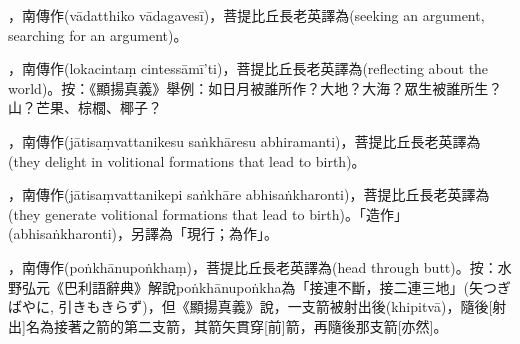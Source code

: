 \startitemgroup[noteitems]
\item{}，南傳作(vādatthiko vādagavesī)，菩提比丘長老英譯為(seeking an argument, searching for an argument)。
\stopitemgroup

\startitemgroup[noteitems]
\item{}，南傳作(lokacintaṃ cintessāmī’ti)，菩提比丘長老英譯為(reflecting about the world)。按：《顯揚真義》舉例：如日月被誰所作？大地？大海？眾生被誰所生？山？芒果、棕櫚、椰子？
\stopitemgroup

\startitemgroup[noteitems]
\item{}，南傳作(jātisaṃvattanikesu saṅkhāresu abhiramanti)，菩提比丘長老英譯為(they delight in volitional formations that lead to birth)。
\stopitemgroup

\startitemgroup[noteitems]
\item{}，南傳作(jātisaṃvattanikepi saṅkhāre abhisaṅkharonti)，菩提比丘長老英譯為(they generate volitional formations that lead to birth)。「造作」(abhisaṅkharonti)，另譯為「現行；為作」。
\stopitemgroup

\startitemgroup[noteitems]
\item{}，南傳作(poṅkhānupoṅkhaṃ)，菩提比丘長老英譯為(head through butt)。按：水野弘元《巴利語辭典》解說poṅkhānupoṅkha為「接連不斷，接二連三地」(矢つぎばやに, 引きもきらず)，但《顯揚真義》說，一支箭被射出後(khipitvā)，隨後[射出]名為接著之箭的第二支箭，其箭矢貫穿[前]箭，再隨後那支箭[亦然]。
\stopitemgroup


